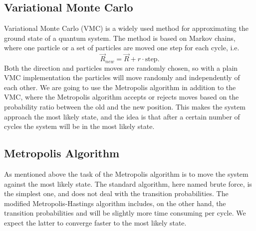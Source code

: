 \documentclass[norsk,a4paper,12pt]{article}
\begin{document}
\subsection{Variational Monte Carlo}\label{VMC}
Variational Monte Carlo (VMC) is a widely used method for approximating the ground state of a quantum system. The method is based on Markov chains, where one particle or a set of particles are moved one step for each cycle, i.e.
\begin{equation}
\vec{R}_{new} = \vec{R} + r\cdot \text{step}.
\end{equation}
Both the direction and particles moves are randomly chosen, so with a plain VMC implementation the particles will move randomly and independently of each other. We are going to use the Metropolis algorithm in addition to the VMC, where the Metropolis algorithm accepts or rejects moves based on the probability ratio between the old and the new position. This makes the system approach the most likely state, and the idea is that after a certain number of cycles the system will be in the most likely state. 

\subsection{Metropolis Algorithm} \label{sec:Metropolis}
As mentioned above the task of the Metropolis algorithm is to move the system against the most likely state. The standard algorithm, here named brute force, is the simplest one, and does not deal with the transition probabilities. The modified Metropolis-Hastings algorithm includes, on the other hand, the transition probabilities and will be slightly more time consuming per cycle. We expect the latter to converge faster to the most likely state. 
\end{document}
